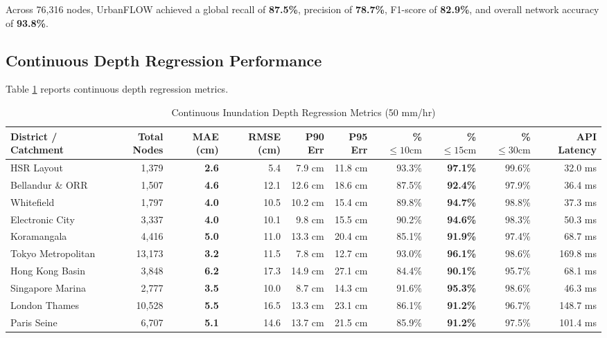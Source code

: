 \documentclass[conference]{IEEEtran}
\begin{document}
Across 76,316 nodes, UrbanFLOW achieved a global recall of \textbf{87.5\%}, precision of \textbf{78.7\%}, F1-score of \textbf{82.9\%}, and overall network accuracy of \textbf{93.8\%}.

\subsection{Continuous Depth Regression Performance}
Table \ref{tab:continuous_regression} reports continuous depth regression metrics.

\begin{table}[t]
\caption{Continuous Inundation Depth Regression Metrics (50 mm/hr)}
\label{tab:continuous_regression}
\centering
\small
\begin{tabular}{lrrrrrrrrr}
\toprule
\textbf{District / Catchment} & \textbf{Total Nodes} & \textbf{MAE (cm)} & \textbf{RMSE (cm)} & \textbf{P90 Err} & \textbf{P95 Err} & \textbf{\% $\le 10\text{cm}$} & \textbf{\% $\le 15\text{cm}$} & \textbf{\% $\le 30\text{cm}$} & \textbf{API Latency} \\
\midrule
HSR Layout & 1,379 & \textbf{2.6} & 5.4 & 7.9 cm & 11.8 cm & 93.3\% & \textbf{97.1\%} & 99.6\% & 32.0 ms \\
Bellandur \& ORR & 1,507 & \textbf{4.6} & 12.1 & 12.6 cm & 18.6 cm & 87.5\% & \textbf{92.4\%} & 97.9\% & 36.4 ms \\
Whitefield & 1,797 & \textbf{4.0} & 10.5 & 10.2 cm & 15.4 cm & 89.8\% & \textbf{94.7\%} & 98.8\% & 37.3 ms \\
Electronic City & 3,337 & \textbf{4.0} & 10.1 & 9.8 cm & 15.5 cm & 90.2\% & \textbf{94.6\%} & 98.3\% & 50.3 ms \\
Koramangala & 4,416 & \textbf{5.0} & 11.0 & 13.3 cm & 20.4 cm & 85.1\% & \textbf{91.9\%} & 97.4\% & 68.7 ms \\
Tokyo Metropolitan & 13,173 & \textbf{3.2} & 11.5 & 7.8 cm & 12.7 cm & 93.0\% & \textbf{96.1\%} & 98.6\% & 169.8 ms \\
Hong Kong Basin & 3,848 & \textbf{6.2} & 17.3 & 14.9 cm & 27.1 cm & 84.4\% & \textbf{90.1\%} & 95.7\% & 68.1 ms \\
Singapore Marina & 2,777 & \textbf{3.5} & 10.0 & 8.7 cm & 14.3 cm & 91.6\% & \textbf{95.3\%} & 98.6\% & 46.3 ms \\
London Thames & 10,528 & \textbf{5.5} & 16.5 & 13.3 cm & 23.1 cm & 86.1\% & \textbf{91.2\%} & 96.7\% & 148.7 ms \\
Paris Seine & 6,707 & \textbf{5.1} & 14.6 & 13.7 cm & 21.5 cm & 85.9\% & \textbf{91.2\%} & 97.5\% & 101.4 ms \\

\end{tabular}
\end{table}
\end{document}
